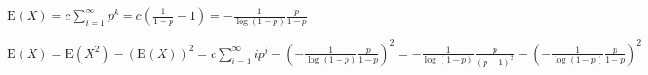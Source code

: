 $\text{E}(X) = c\sum_{i=1}^{\infty}p^{k} = c(\frac{1}{1-p} - 1) = -\frac{1}{\log(1-p)}\frac{p}{1-p}$

$\text{E}(X) = \text{E}(X^{2}) - (\text{E}(X))^{2} = c \sum_{i=1}^{\infty}ip^{i}
- (-\frac{1}{\log(1-p)}\frac{p}{1-p})^{2} = -\frac{1}{\log(1-p)} \frac{p}{
(p-1)^{2}} - (-\frac{1}{\log(1-p)}\frac{p}{1-p})^{2}$